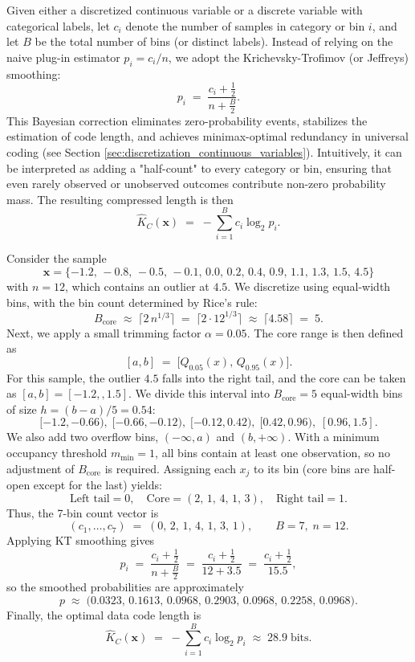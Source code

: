 Given either a discretized continuous variable or a discrete variable with categorical labels, let $c_i$ denote the number of samples in category or bin $i$, and let $B$ be the total number of bins (or distinct labels). Instead of relying on the naive plug-in estimator $p_i = c_i/n$, we adopt the Krichevsky-Trofimov (or Jeffreys) smoothing:
\[
p_i \;=\; \frac{c_i + \tfrac{1}{2}}{n + \tfrac{B}{2}}.  
\]
This Bayesian correction eliminates zero-probability events, stabilizes the estimation of code length, and achieves minimax-optimal redundancy in universal coding (see Section \ref{sec:discretization_continuous_variables}). Intuitively, it can be interpreted as adding a "half-count" to every category or bin, ensuring that even rarely observed or unobserved outcomes contribute non-zero probability mass. The resulting compressed length is then
\[
\hat{K}_C(\mathbf{x}) \;=\; - \sum_{i=1}^B c_i \log_2 p_i.  
\]

\begin{example}
Consider the sample
\[
\mathbf{x} = \{-1.2,\,-0.8,\,-0.5,\,-0.1,\,0.0,\,0.2,\,0.4,\,0.9,\,1.1,\,1.3,\,1.5,\,4.5\}  
\]
with $n=12$, which contains an outlier at $4.5$. We discretize using equal-width bins, with the bin count determined by Rice's rule:
\[
B_{\text{core}} \;\approx\; \lceil 2\,n^{1/3}\rceil \;=\; \lceil 2 \cdot 12^{1/3}\rceil \;\approx\; \lceil 4.58\rceil \;=\; 5.  
\]
Next, we apply a small trimming factor $\alpha=0.05$. The core range is then defined as
\[
[a,b] \;=\; \bigl[ Q_{0.05}(x),\,Q_{0.95}(x) \bigr].  
\]
For this sample, the outlier $4.5$ falls into the right tail, and the core can be taken as $[a,b] = [-1.2,,1.5]$. We divide this interval into $B_{\text{core}}=5$ equal-width bins of size $h=(b-a)/5=0.54$:
\[
[-1.2,-0.66),\;[-0.66,-0.12),\;[-0.12,0.42),\;[0.42,0.96),\;[0.96,1.5].  
\]
We also add two overflow bins, $(-\infty,a)$ and $(b,+\infty)$. With a minimum occupancy threshold $m_{\min}=1$, all bins contain at least one observation, so no adjustment of $B_{\text{core}}$ is required. Assigning each $x_j$ to its bin (core bins are half-open except for the last) yields:
\[
\text{Left tail}=0,\quad  
\text{Core}=(2,\,1,\,4,\,1,\,3),\quad  
\text{Right tail}=1.  
\]
Thus, the 7-bin count vector is
\[
(c_1,\ldots,c_7) \;=\; (0,\,2,\,1,\,4,\,1,\,3,\,1), \qquad B=7,\; n=12.  
\]
Applying KT smoothing gives
\[
p_i \;=\; \frac{c_i + \tfrac12}{n + \tfrac{B}{2}}  
\;=\; \frac{c_i + \tfrac12}{12+3.5}  
\;=\; \frac{c_i + \tfrac12}{15.5},  
\]
so the smoothed probabilities are approximately
\[
p \;\approx\; \bigl(0.0323,\,0.1613,\,0.0968,\,0.2903,\,0.0968,\,0.2258,\,0.0968 \bigr).  
\]
Finally, the optimal data code length is
\[
\widehat{K}_C(\mathbf{x}) \;=\; -\sum_{i=1}^{B} c_i \log_2 p_i  
\;\approx\; 28.9 \;\text{bits.}  
\]
\end{example}


